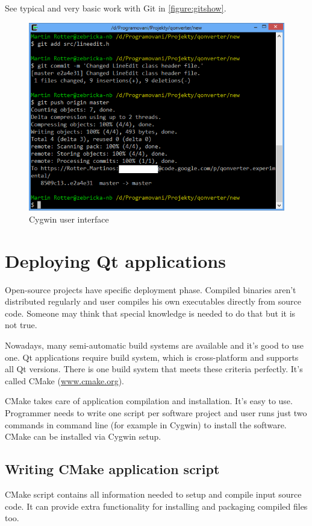 See typical and very basic work with Git in \autoref{figure:gitshow}.

\begin{figure}[ht]
\begin{center}
\includegraphics[width=12cm]{graphics/real-world/05-gitshow.png}
\caption{Cygwin user interface}\label{figure:gitshow}
\end{center}
\end{figure}

\section{Deploying Qt applications}
Open-source projects have specific deployment phase. Compiled binaries aren't distributed regularly and user compiles his own executables directly from source code. Someone may think that special knowledge is needed to do that but it is not true.

Nowadays, many semi-automatic build systems are available and it's good to use one. Qt applications require build system, which is cross-platform and supports all Qt versions. There is one build system that meets these criteria perfectly. It's called CMake (\href{http://www.cmake.org}{www.cmake.org}).

CMake takes care of application compilation and installation. It's easy to use. Programmer needs to write one script per software project and user runs just two commands in command line (for example in Cygwin) to install the software. CMake can be installed via Cygwin setup.

\subsection{Writing CMake application script}
CMake script contains all information needed to setup and compile input source code. It can provide extra functionality for installing and packaging compiled files too.

